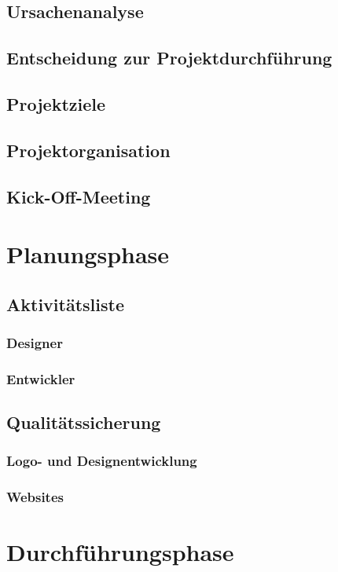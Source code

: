 \documentclass[12pt,a4paper]{article}
\begin{document}
\subsection{Ursachenanalyse}
\subsection{Entscheidung zur Projektdurchführung}
\subsection{Projektziele}
\subsection{Projektorganisation}
\subsection{Kick-Off-Meeting}
\newpage
\section{Planungsphase}
\subsection{Aktivitätsliste}
\subsubsection{Designer}
\subsubsection{Entwickler}
\subsection{Qualitätssicherung}
\subsubsection{Logo- und Designentwicklung}
\subsubsection{Websites}


\newpage
\section{Durchführungsphase}
\end{document}
